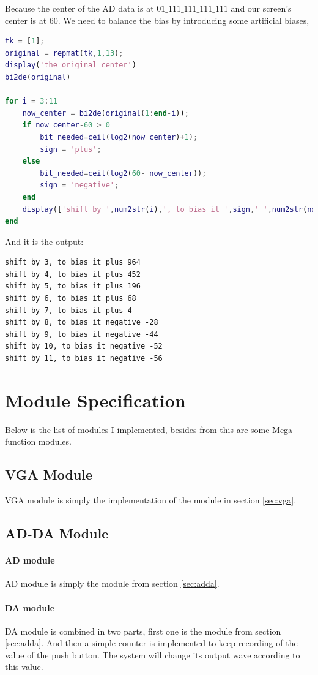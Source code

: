 \documentclass[11pt]{scrartcl}
\begin{document}
\label{sec:biased}
Because the center of the AD data is at $01\_111\_111\_111\_111$ and our screen's center is at 60. We need to balance the bias by introducing some artificial biases, 
\begin{lstlisting}[language=Matlab]
tk = [1];
original = repmat(tk,1,13);
display('the original center')
bi2de(original)

for i = 3:11
    now_center = bi2de(original(1:end-i));
    if now_center-60 > 0
        bit_needed=ceil(log2(now_center)+1);
        sign = 'plus';
    else
        bit_needed=ceil(log2(60- now_center));
        sign = 'negative';
    end
    display(['shift by ',num2str(i),', to bias it ',sign,' ',num2str(now_center-59)])
end
\end{lstlisting}
And it is the output:
\begin{verbatim}
shift by 3, to bias it plus 964
shift by 4, to bias it plus 452
shift by 5, to bias it plus 196
shift by 6, to bias it plus 68
shift by 7, to bias it plus 4
shift by 8, to bias it negative -28
shift by 9, to bias it negative -44
shift by 10, to bias it negative -52
shift by 11, to bias it negative -56
\end{verbatim}

\section{Module Specification}

Below is the list of modules I implemented, besides from this are some Mega function modules.
\subsection{VGA Module}
VGA module is simply the implementation of the module in section \ref{sec:vga}.
\subsection{AD-DA Module}
\paragraph{AD module}
AD module is simply the module from section \ref{sec:adda}. 
\paragraph{DA module}

DA module is combined in two parts, first one is the module from section \ref{sec:adda}. And then a simple counter is implemented to keep recording of the value of the push button. The system will change its output wave according to this value.
\end{document}
